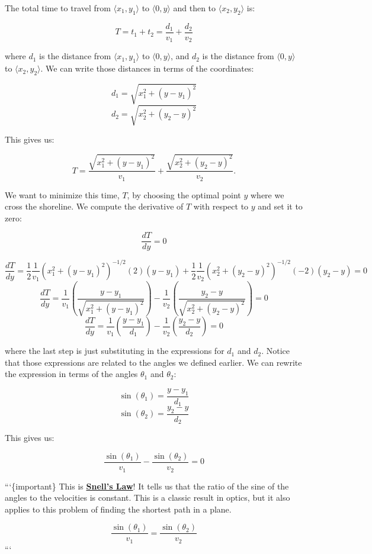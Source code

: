 \documentclass[11pt]{article}
\begin{document}
The total time to travel from \(\langle x_1, y_1 \rangle\) to
\(\langle 0, y \rangle\) and then to \(\langle x_2, y_2 \rangle\) is:

\[T = t_1 + t_2 = \dfrac{d_1}{v_1} + \dfrac{d_2}{v_2}\]

where \(d_1\) is the distance from \(\langle x_1, y_1 \rangle\) to
\(\langle 0, y \rangle\), and \(d_2\) is the distance from
\(\langle 0, y \rangle\) to \(\langle x_2, y_2 \rangle\). We can write
those distances in terms of the coordinates:

\[d_1 = \sqrt{x_1^2 + (y - y_1)^2}\]
\[d_2 = \sqrt{x_2^2 + (y_2 - y)^2}\]

This gives us:

\[T = \dfrac{\sqrt{x_1^2 + (y - y_1)^2}}{v_1} + \dfrac{\sqrt{x_2^2 + (y_2 - y)^2}}{v_2}.\]

We want to minimize this time, \(T\), by choosing the optimal point
\(y\) where we cross the shoreline. We compute the derivative of \(T\)
with respect to \(y\) and set it to zero:

\[\dfrac{dT}{dy} = 0\]

\[\dfrac{dT}{dy} = \dfrac{1}{2}\dfrac{1}{v_1}\left(x_1^2 + (y-y_1)^2\right)^{-1/2}(2)(y-y_1) + \dfrac{1}{2}\dfrac{1}{v_2}\left(x_2^2 + (y_2-y)^2\right)^{-1/2}(-2)(y_2-y) = 0\]
\[\dfrac{dT}{dy} = \dfrac{1}{v_1}\left(\dfrac{y-y_1}{\sqrt{x_1^2 + (y-y_1)^2}}\right) - \dfrac{1}{v_2}\left(\dfrac{y_2-y}{\sqrt{x_2^2 + (y_2-y)^2}}\right) = 0\]
\[\dfrac{dT}{dy} = \dfrac{1}{v_1}\left(\dfrac{y-y_1}{d_1}\right) - \dfrac{1}{v_2}\left(\dfrac{y_2-y}{d_2}\right) = 0\]

where the last step is just substituting in the expressions for \(d_1\)
and \(d_2\). Notice that those expressions are related to the angles we
defined earlier. We can rewrite the expression in terms of the angles
\(\theta_1\) and \(\theta_2\):

\[\sin(\theta_1) = \frac{y - y_1}{d_1}\]
\[\sin(\theta_2) = \frac{y_2 - y}{d_2}\]

This gives us:

\[\dfrac{\sin(\theta_1)}{v_1} - \dfrac{\sin(\theta_2)}{v_2} = 0\]

```\{important\} This is
\href{https://en.wikipedia.org/wiki/Snell\%27s_law}{\textbf{Snell's
Law}}! It tells us that the ratio of the sine of the angles to the
velocities is constant. This is a classic result in optics, but it also
applies to this problem of finding the shortest path in a plane.

\[\dfrac{\sin(\theta_1)}{v_1} = \dfrac{\sin(\theta_2)}{v_2}\] ```
\end{document}
